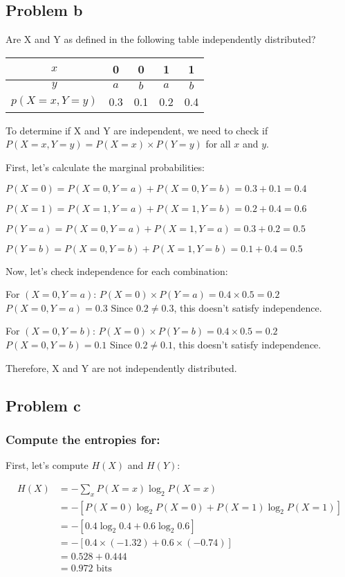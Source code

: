 \documentclass[a4paper,margin=1cm]{article}
\begin{document}
\subsection{Problem b}
Are X and Y as defined in the following table independently distributed?

\begin{table}[h]
\centering
\begin{tabular}{|c|c|c|c|c|}
\hline
$x$ & 0 & 0 & 1 & 1 \\
\hline
$y$ & $a$ & $b$ & $a$ & $b$ \\
\hline
$p(X=x, Y=y)$ & 0.3 & 0.1 & 0.2 & 0.4 \\
\hline
\end{tabular}
\end{table}

To determine if X and Y are independent, we need to check if $P(X=x, Y=y) = P(X=x) \times P(Y=y)$ for all $x$ and $y$.

First, let's calculate the marginal probabilities:

$P(X=0) = P(X=0, Y=a) + P(X=0, Y=b) = 0.3 + 0.1 = 0.4$

$P(X=1) = P(X=1, Y=a) + P(X=1, Y=b) = 0.2 + 0.4 = 0.6$

$P(Y=a) = P(X=0, Y=a) + P(X=1, Y=a) = 0.3 + 0.2 = 0.5$

$P(Y=b) = P(X=0, Y=b) + P(X=1, Y=b) = 0.1 + 0.4 = 0.5$

Now, let's check independence for each combination:

For $(X=0, Y=a)$:
$P(X=0) \times P(Y=a) = 0.4 \times 0.5 = 0.2$
$P(X=0, Y=a) = 0.3$
Since $0.2 \neq 0.3$, this doesn't satisfy independence.

For $(X=0, Y=b)$:
$P(X=0) \times P(Y=b) = 0.4 \times 0.5 = 0.2$
$P(X=0, Y=b) = 0.1$
Since $0.2 \neq 0.1$, this doesn't satisfy independence.

Therefore, X and Y are not independently distributed.

\subsection{Problem c}
\subsubsection{Compute the entropies for:}

First, let's compute $H(X)$ and $H(Y)$:

\begin{align*}
H(X) &= -\sum_{x} P(X=x) \log_2 P(X=x)\\
&= -[P(X=0) \log_2 P(X=0) + P(X=1) \log_2 P(X=1)]\\
&= -[0.4 \log_2 0.4 + 0.6 \log_2 0.6]\\
&= -[0.4 \times (-1.32) + 0.6 \times (-0.74)]\\
&= 0.528 + 0.444\\
&= 0.972 \text{ bits}
\end{align*}
\end{document}
